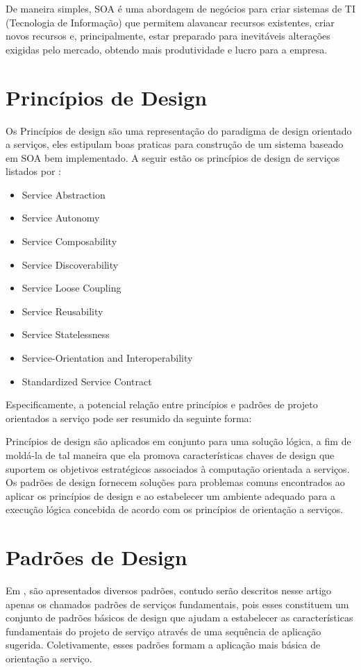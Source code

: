 \documentclass[12pt]{article}
\begin{document}
De maneira simples, SOA é uma abordagem de negócios para criar sistemas de TI (Tecnologia de Informação) que permitem alavancar recursos existentes, criar novos recursos e, principalmente, estar preparado para inevitáveis alterações exigidas pelo mercado, obtendo mais produtividade e lucro para a empresa.


\section{Princípios de Design} 

Os Princípios de design são uma representação do paradigma de design orientado a serviços, eles estipulam boas praticas para construção de um sistema baseado em SOA bem implementado. A seguir estão os princípios de design de serviços listados por \cite{erl_principio}:

\begin{itemize}
\item Service Abstraction
\item Service Autonomy
\item Service Composability 
\item Service Discoverability
\item Service Loose Coupling
\item Service Reusability
\item Service Statelessness
\item Service-Orientation and Interoperability
\item Standardized Service Contract
\end{itemize}

Especificamente, a potencial relação entre princípios e padrões de projeto orientados a serviço pode ser resumido da seguinte forma:

Princípios de design são aplicados em conjunto para uma solução lógica, a fim de moldá-la de tal maneira que ela promova características chaves de design que suportem os objetivos estratégicos associados à computação orientada a serviços.
Os padrões de design fornecem soluções para problemas comuns encontrados ao aplicar os princípios de design e ao estabelecer um ambiente adequado para a execução lógica concebida de acordo com os princípios de orientação a serviços.

\section{Padrões de Design}

Em \cite{erl_padroes}, são apresentados diversos padrões, contudo serão descritos nesse artigo apenas os chamados padrões de serviços fundamentais, pois esses constituem um conjunto de padrões básicos de design que ajudam a estabelecer as características fundamentais do projeto de serviço através de uma sequência de aplicação sugerida. Coletivamente, esses padrões formam a aplicação mais básica de orientação a serviço.
\end{document}
